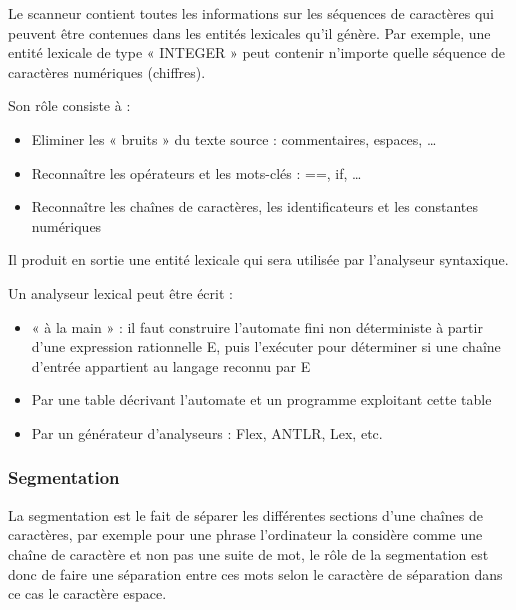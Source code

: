 \documentclass{article}
\begin{document}
Le scanneur contient toutes les informations sur les séquences de caractères qui peuvent être contenues dans les entités lexicales qu'il génère. Par exemple, une entité lexicale de type « INTEGER » peut contenir n'importe quelle séquence de caractères numériques (chiffres).

Son rôle consiste à :
\begin{itemize}
			\item Eliminer les « bruits » du texte source : commentaires, espaces, …
			\item Reconnaître les opérateurs et les mots-clés : ==, if, …
			\item Reconnaître les chaînes de caractères, les identificateurs et les constantes numériques
\end{itemize}
Il produit en sortie une entité lexicale qui sera utilisée par l'analyseur syntaxique.

Un analyseur lexical peut être écrit :
\begin{itemize}
			\item « à la main » : il faut construire l'automate fini non déterministe à partir d'une expression rationnelle E, puis l'exécuter pour déterminer si une chaîne d'entrée appartient au langage reconnu par E
			\item Par une table décrivant l'automate et un programme exploitant cette table
			\item Par un générateur d'analyseurs : Flex, ANTLR, Lex, etc.
\end{itemize}    

\subsubsection{Segmentation}
La segmentation est le fait de séparer les différentes sections d’une chaînes de caractères, par exemple pour une phrase l’ordinateur la considère comme une chaîne de caractère et non pas une suite de mot, le rôle de la segmentation est donc de faire une séparation entre ces mots selon le caractère de séparation dans ce cas le caractère espace.
\end{document}
